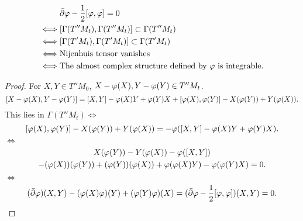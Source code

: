 \documentclass[12pt]{article}
\begin{document}
\begin{prop}
  \begin{align*}
    &\bar{\partial}\varphi-\frac{1}{2}[\varphi,\varphi]=0 \\
    \iff & [\Gamma(T''M_t),\Gamma(T''M_t)]\subset \Gamma(T''M_t) \\
    \iff & [\Gamma(T'M_t),\Gamma(T'M_t)]\subset \Gamma(T'M_t) \\
    \iff & \text{Nijenhuis tensor vanishes} \\
    \iff & \text{The almost complex structure defined by }\varphi\text{ is integrable}
  .\end{align*}
\end{prop}
\begin{proof}
  For \(X,Y\in T''M_0\), \(X-\varphi(X),Y-\varphi(Y)\in T''M_t\). \[
    [X-\varphi(X),Y-\varphi(Y)]=[X,Y]-\varphi(X)Y+\varphi(Y)X+[\varphi(X),\varphi(Y)]
    -X(\varphi(Y))+Y(\varphi(X))
  .\] This lies in \(\Gamma(T''M_t)\iff\) \[
    [\varphi(X),\varphi(Y)]-X(\varphi(Y))+Y(\varphi(X))=-\varphi([X,Y]-\varphi(X)Y+\varphi(Y)X)
  .\] \(\iff \)
  \begin{multline*}
    X(\varphi(Y))-Y(\varphi(X))-\varphi([X,Y]) \\
    -(\varphi(X))(\varphi(Y))+(\varphi(Y))(\varphi(X))+\varphi(\varphi(X)Y)-\varphi(\varphi(Y)X)
    =0
  .\end{multline*} 
  \(\iff \) \[
    (\bar{\partial}\varphi)(X,Y)-(\varphi(X)\varphi)(Y)+(\varphi(Y)\varphi)(X)=
    (\bar{\partial}\varphi-\frac{1}{2}[\varphi,\varphi])(X,Y)=0
  .\] 
\end{proof}
\end{document}

